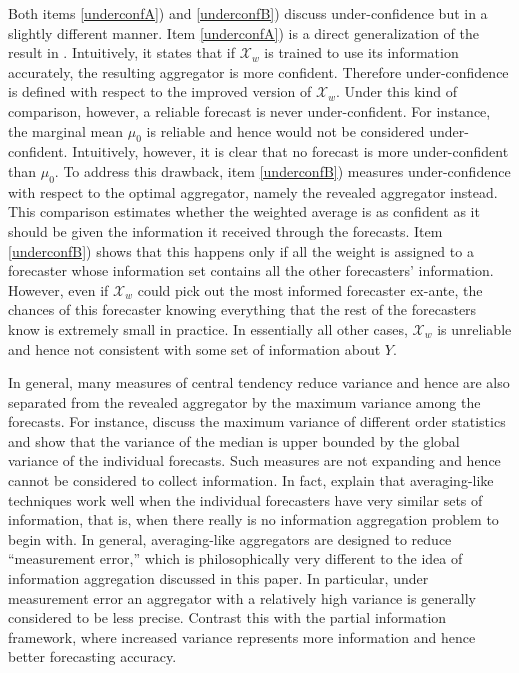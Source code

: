 \documentclass[11pt]{article}
\theoremstyle{definition}
\theoremstyle{definition}
\begin{document}
Both items \ref{underconfA}) and \ref{underconfB}) discuss under-confidence but in a slightly different manner. Item \ref{underconfA}) is a direct generalization of the result in \cite{Ranjan08}. Intuitively, it states that if $\mathcal{X}_w$ is trained to use its information accurately, the resulting aggregator is more confident. Therefore under-confidence is defined with respect to the improved version of  $\mathcal{X}_w$. Under this kind of comparison, however, a reliable forecast is never under-confident. For instance, 
the marginal mean $\mu_0$ is reliable and hence would not be considered under-confident. Intuitively, however, it is clear that no forecast is more under-confident than $\mu_0$. To address this drawback, item \ref{underconfB}) measures under-confidence with respect to the optimal aggregator, namely the revealed aggregator instead. This comparison estimates whether the weighted average is as confident as it should be given the information it received through the forecasts. Item \ref{underconfB}) shows that this happens only if all the weight is assigned to a forecaster whose information set contains all the other forecasters' information. However, even if $\mathcal{X}_w$ could pick out the most informed forecaster ex-ante, the chances of this forecaster knowing everything that the rest of the forecasters know is extremely small in practice. In essentially all other cases, $\mathcal{X}_w$ is unreliable 
and hence not consistent with some set of information about $Y$. 

In general, many measures of central tendency reduce variance and hence are also separated from the revealed aggregator by the maximum variance among the forecasts. For instance, \cite{papadatos1995maximum} discuss the maximum variance of different order statistics and show that the variance of the median is upper bounded by the global variance of the individual forecasts. Such measures are not expanding and hence cannot be considered to collect information. In fact, \cite{satopaamodeling} explain that averaging-like techniques work well when the individual forecasters have very similar sets of information, that is, when there really is no information aggregation problem to begin with. In general, averaging-like aggregators are designed to reduce ``measurement error,'' which is philosophically very different to the idea of information aggregation discussed in this paper. In particular, under measurement error an aggregator with a relatively high variance is generally considered to be less precise. Contrast this with the partial information framework, where increased variance represents more information and hence better forecasting accuracy.
\end{document}

